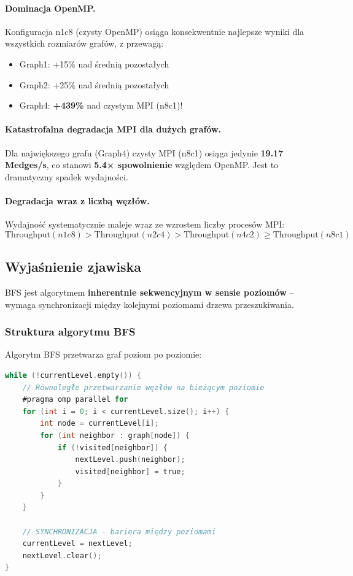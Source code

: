 \paragraph{Dominacja OpenMP.} Konfiguracja n1c8 (czysty OpenMP) osiąga konsekwentnie najlepsze wyniki dla wszystkich rozmiarów grafów, z przewagą:
\begin{itemize}
    \item Graph1: +15\% nad średnią pozostałych
    \item Graph2: +25\% nad średnią pozostałych
    \item Graph4: \textbf{+439\%} nad czystym MPI (n8c1)!
\end{itemize}

\paragraph{Katastrofalna degradacja MPI dla dużych grafów.} Dla największego grafu (Graph4) czysty MPI (n8c1) osiąga jedynie \textbf{19.17 Medges/s}, co stanowi \textbf{5.4× spowolnienie} względem OpenMP. Jest to dramatyczny spadek wydajności.

\paragraph{Degradacja wraz z liczbą węzłów.} Wydajność systematycznie maleje wraz ze wzrostem liczby procesów MPI:
\begin{equation}
    \text{Throughput}(n1c8) > \text{Throughput}(n2c4) > \text{Throughput}(n4c2) \geq \text{Throughput}(n8c1)
\end{equation}

\subsection{Wyjaśnienie zjawiska}

BFS jest algorytmem \textbf{inherentnie sekwencyjnym w sensie poziomów} -- wymaga synchronizacji między kolejnymi poziomami drzewa przeszukiwania.

\subsubsection{Struktura algorytmu BFS}

Algorytm BFS przetwarza graf poziom po poziomie:

\begin{lstlisting}[language=C]
while (!currentLevel.empty()) {
    // Równoległe przetwarzanie węzłów na bieżącym poziomie
    #pragma omp parallel for
    for (int i = 0; i < currentLevel.size(); i++) {
        int node = currentLevel[i];
        for (int neighbor : graph[node]) {
            if (!visited[neighbor]) {
                nextLevel.push(neighbor);
                visited[neighbor] = true;
            }
        }
    }
    
    // SYNCHRONIZACJA - bariera między poziomami
    currentLevel = nextLevel;
    nextLevel.clear();
}
\end{lstlisting}

